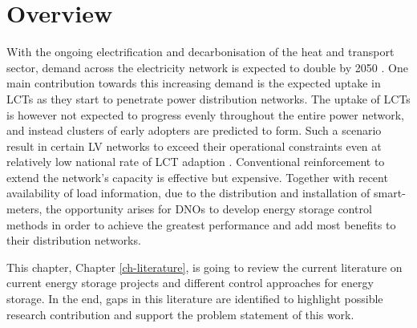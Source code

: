 \section{Overview}
\label{ch-literature:sec:overview}

With the ongoing electrification and decarbonisation of the heat and transport sector, demand across the electricity network is expected to double by 2050 \cite{Wilks2010}.
One main contribution towards this increasing demand is the expected uptake in LCTs as they start to penetrate power distribution networks.
The uptake of LCTs is however not expected to progress evenly throughout the entire power network, and instead clusters of early adopters are predicted to form.
Such a scenario result in certain LV networks to exceed their operational constraints even at relatively low national rate of LCT adaption \cite{Poghosyan2014}.
Conventional reinforcement to extend the network's capacity is effective but expensive.
Together with recent availability of load information, due to the distribution and installation of smart-meters, the opportunity arises for DNOs to develop energy storage control methods in order to achieve the greatest performance and add most benefits to their distribution networks.

This chapter, Chapter \ref{ch-literature}, is going to review the current literature on current energy storage projects and different control approaches for energy storage.
In the end, gaps in this literature are identified to highlight possible research contribution and support the problem statement of this work.